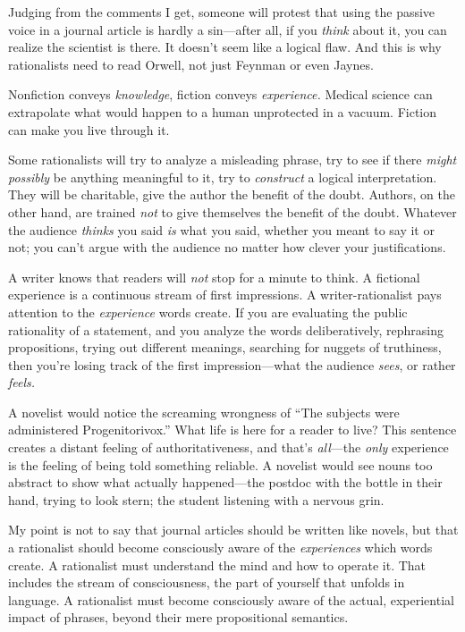 {
 Judging from the comments I get, someone will protest that using
the passive voice in a journal article is hardly a sin---after all, if
you \textit{think} about it, you can realize the scientist is there. It
doesn't seem like a logical flaw. And this is why
rationalists need to read Orwell, not just Feynman or even Jaynes.}

{
 Nonfiction conveys \textit{knowledge}, fiction conveys
\textit{experience.} Medical science can extrapolate what would happen
to a human unprotected in a vacuum. Fiction can make you live through
it.}

{
 Some rationalists will try to analyze a misleading phrase, try to
see if there \textit{might possibly} be anything meaningful to it, try
to \textit{construct} a logical interpretation. They will be
charitable, give the author the benefit of the doubt. Authors, on the
other hand, are trained \textit{not} to give themselves the benefit of
the doubt. Whatever the audience \textit{thinks} you said \textit{is}
what you said, whether you meant to say it or not; you
can't argue with the audience no matter how clever your
justifications.}

{
 A writer knows that readers will \textit{not} stop for a minute to
think. A fictional experience is a continuous stream of first
impressions. A writer-rationalist pays attention to the
\textit{experience} words create. If you are evaluating the public
rationality of a statement, and you analyze the words deliberatively,
rephrasing propositions, trying out different meanings, searching for
nuggets of truthiness, then you're losing track of the
first impression---what the audience \textit{sees}, or rather
\textit{feels.}}

{
 A novelist would notice the screaming wrongness of
``The subjects were administered
Progenitorivox.'' What life is here for a reader to
live? This sentence creates a distant feeling of authoritativeness, and
that's \textit{all}{}---the \textit{only} experience is
the feeling of being told something reliable. A novelist would see
nouns too abstract to show what actually happened---the postdoc with
the bottle in their hand, trying to look stern; the student listening
with a nervous grin.}

{
 My point is not to say that journal articles should be written
like novels, but that a rationalist should become consciously aware of
the \textit{experiences} which words create. A rationalist must
understand the mind and how to operate it. That includes the stream of
consciousness, the part of yourself that unfolds in language. A
rationalist must become consciously aware of the actual, experiential
impact of phrases, beyond their mere propositional semantics.}


